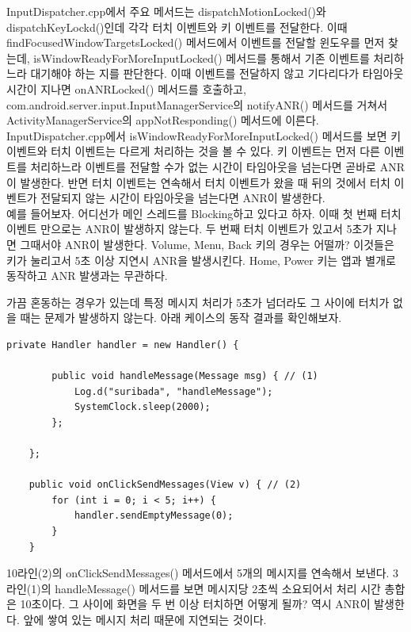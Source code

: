 InputDispatcher.cpp에서 주요 메서드는 dispatchMotionLocked()와 dispatchKeyLockd()인데 각각 터치 이벤트와 키 이벤트를 전달한다. 이때 findFocusedWindowTargetsLocked() 메서드에서 이벤트를 전달할 윈도우를 먼저 찾는데, isWindowReadyForMoreInputLocked() 메서드를 통해서 기존 이벤트를 처리하느라 대기해야 하는 지를 판단한다.
이때 이벤트를 전달하지 않고 기다리다가 타임아웃 시간이 지나면 onANRLocked() 메서드를 호출하고, com.android.server.input.InputManagerService의 notifyANR() 메서드를 거쳐서 ActivityManagerService의 appNotResponding() 메서드에 이른다.\\

InputDispatcher.cpp에서 isWindowReadyForMoreInputLocked() 메서드를 보면 키 이벤트와 터치 이벤트는 다르게 처리하는 것을 볼 수 있다. 키 이벤트는 먼저 다른 이벤트를 처리하느라 이벤트를 전달할 수가 없는 시간이 타임아웃을 넘는다면 곧바로 ANR이 발생한다. 반면 터치 이벤트는 연속해서 터치 이벤트가 왔을 때 뒤의 것에서 터치 이벤트가 전달되지 않는 시간이 타임아웃을 넘는다면 ANR이 발생한다.\\

예를 들어보자. 
어디선가 메인 스레드를 Blocking하고 있다고 하자.
이때 첫 번째 터치 이벤트 만으로는 ANR이 발생하지 않는다. 두 번째 터치 이벤트가 있고서 5초가 지나면 그때서야 ANR이 발생한다.
Volume, Menu, Back 키의 경우는 어떨까? 이것들은 키가 눌리고서 5초 이상 지연시 ANR을 발생시킨다.
Home, Power 키는 앱과 별개로 동작하고 ANR 발생과는 무관하다.\\

가끔 혼동하는 경우가 있는데 특정 메시지 처리가 5초가 넘더라도 그 사이에 터치가 없을 때는 문제가 발생하지 않는다. 아래 케이스의 동작 결과를 확인해보자. 
\begin{lstlisting}[frame=single] 
 	private Handler handler = new Handler() {

		public void handleMessage(Message msg) { // (1)
			Log.d("suribada", "handleMessage");
			SystemClock.sleep(2000);
		};

	};

	public void onClickSendMessages(View v) { // (2)
		for (int i = 0; i < 5; i++) {
			handler.sendEmptyMessage(0);
		}
	}
\end{lstlisting}
10라인(2)의 onClickSendMessages() 메서드에서 5개의 메시지를 연속해서 보낸다.
3라인(1)의 handleMessage() 메서드를 보면 메시지당 2초씩 소요되어서 처리 시간 총합은 10초이다. 그 사이에 화면을 두 번 이상 터치하면 어떻게 될까? 역시 ANR이 발생한다. 앞에 쌓여 있는 메시지 처리 때문에 지연되는 것이다.\\

